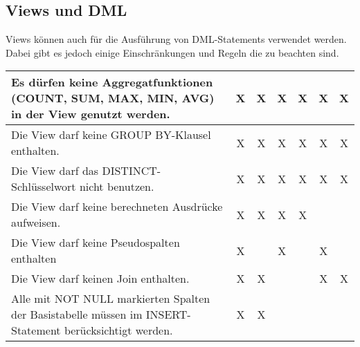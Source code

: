       \subsection{Views und DML}
        Views k\"onnen  auch f\"ur die Ausf\"uhrung von DML-Statements verwendet werden. Dabei gibt es jedoch einige Einschr\"ankungen und Regeln die zu beachten sind.
        \begin{center}
          \label{rulesdmlviews}
          \begin{small}
            \tabletail{
              \hline
            }
            \tablelasttail {
              \hline
            }
            \begin{supertabular}{|p{8.5cm}|c|c|c|c|c|c|}
              Es d\"urfen keine Aggregatfunktionen (COUNT, SUM, MAX, MIN, AVG) in der View genutzt werden. & X & X & X & X & X & X \\
              \hline
              Die View darf keine GROUP BY-Klausel enthalten. & X & X & X & X & X & X \\
              \hline
              Die View darf das DISTINCT-Schl\"usselwort nicht benutzen. & X & X & X & X & X & X\\
              \hline
              Die View darf keine berechneten Ausdr\"ucke aufweisen. & X & X & X & X & & \\
              \hline
              Die View darf keine Pseudospalten enthalten & X & & X & & X & \\
              \hline
              Die View darf keinen Join enthalten. & X & X & & & X & X \\
              \hline
              Alle mit NOT NULL markierten Spalten der Basistabelle m\"ussen im INSERT-Statement ber\"ucksichtigt werden. & X & X & & & & \\

\end{supertabular}
\end{small}
\end{center}
